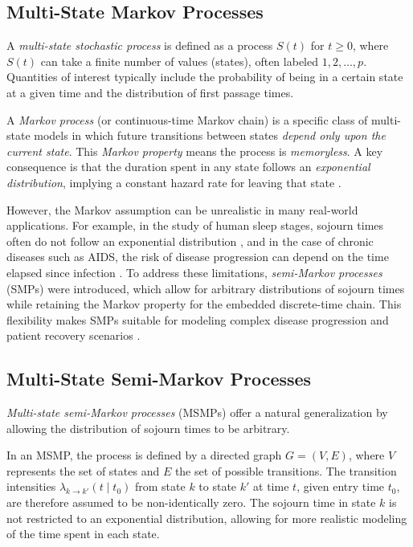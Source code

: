 \documentclass{sn-jnl}
\begin{document}
\subsection{Multi-State Markov Processes}

A \emph{multi-state stochastic process} is defined as a process $S(t)$ for $t \geq 0$, where $S(t)$ can take a finite number of values (states), often labeled $1, 2, \dots, p$. Quantities of interest typically include the probability of being in a certain state at a given time and the distribution of first passage times.

A \emph{Markov process} (or continuous-time Markov chain) is a
specific class of multi-state models in which future transitions between states \emph{depend only upon the current state}. This \emph{Markov property} means the process is \emph{memoryless}. A key consequence is that the duration spent in any state follows an \emph{exponential distribution}, implying a constant hazard rate for leaving that state \citep{jackson2011multi,putter2007competing}.

However, the Markov assumption can be unrealistic in many real-world applications. For example, in the study of human sleep stages, sojourn times often do not follow an exponential distribution \citep{dong2008non, roever2010statistical}, and in the case of chronic diseases such as AIDS, the risk of disease progression can depend on the time elapsed since infection \citep{andersen1999multi}. To address these limitations, \emph{semi-Markov processes} (SMPs) were introduced, which allow for arbitrary distributions of sojourn times while retaining the Markov property for the embedded discrete-time chain. This flexibility makes SMPs suitable for modeling complex disease progression and patient recovery scenarios \citep{putter2007competing}.

\subsection{Multi-State Semi-Markov Processes}

\emph{Multi-state semi-Markov processes} (MSMPs) offer a natural generalization by allowing the distribution of sojourn times to be arbitrary.

In an MSMP, the process is defined by a directed graph $G = (V, E)$,
where $V$ represents the set of states and $E$ the set of possible transitions. The transition intensities $\lambda_{k \to k'}(t \mid t_0)$ from state $k$ to state $k'$ at time $t$, given entry time $t_0$, are therefore assumed to be non-identically zero. The sojourn time in state $k$ is not restricted to an exponential distribution, allowing for more realistic modeling of the time spent in each state.
\end{document}
